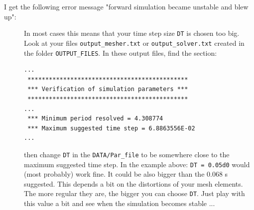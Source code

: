 \begin{description}
\item [{I get the following error message "forward simulation became unstable and blew up":}] In
most cases this means that your time step size \texttt{DT} is chosen
too big. Look at your files \texttt{output\_mesher.txt} or \texttt{output\_solver.txt}
created in the folder \texttt{OUTPUT\_FILES}. In these output files,
find the section:

{\footnotesize
\begin{verbatim}
...
 *********************************************
 *** Verification of simulation parameters ***
 *********************************************
...
 *** Minimum period resolved = 4.308774
 *** Maximum suggested time step = 6.8863556E-02
...
\end{verbatim}
}

then change \texttt{DT} in the \texttt{DATA/Par\_file} to be somewhere
close to the maximum suggested time step. In the example above: \newline
 \texttt{DT = 0.05d0} \newline
 would (most probably) work fine. It could be also bigger than the
0.068 s suggested. This depends a bit on the distortions of your mesh
elements. The more regular they are, the bigger you can choose \texttt{DT}.
Just play with this value a bit and see when the simulation becomes
stable ...

\end{description}

